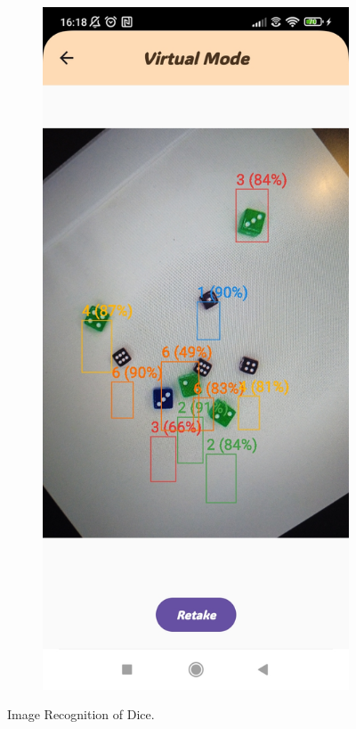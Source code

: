 \begin{figure}[ht!]
\begin{subfigure}[b]{0.27\textwidth}
    \end{subfigure}
    \hfill
    \begin{subfigure}[b]{0.27\textwidth}
        \includegraphics[width=\textwidth]{img/virtual screen3.jpg}
    \end{subfigure}   
    \caption{Image Recognition of Dice.}
    \label{fig:image_recognition}
\end{figure}


